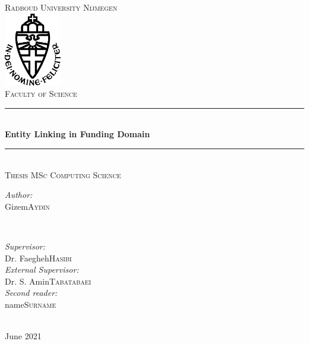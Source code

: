 \documentclass{report}
\title{\thesistitle}
\author{\thesisauthorfirst\space\thesisauthorsecond}
\date{\thesisdate}
\def\thesistitle{Entity Linking in Funding Domain}
\def\thesissubtitle{Thesis Subtitle}
\def\thesisauthorfirst{Gizem}
\def\thesisauthorsecond{Aydin}
\def\thesissupervisorfirst{Dr. Faegheh}
\def\thesissupervisorsecond{Hasibi}
\def\extthesissupervisorfirst{Dr. S. Amin}
\def\extthesissupervisorsecond{Tabatabaei}
\def\thesissecondreaderfirst{name}
\def\thesissecondreadersecond{Surname}
\def\thesisdate{June 2021}
\theoremstyle{definition}
\theoremstyle{remark}
\begin{document}
\begin{titlepage}
	\thispagestyle{empty}
	\newcommand{\HRule}{\rule{\linewidth}{0.5mm}}
	\center
	\textsc{\Large Radboud University Nijmegen}\\[.7cm]
	\includegraphics[width=25mm]{img/in_dei_nomine_feliciter.eps}\\[.5cm]
	\textsc{Faculty of Science}\\[0.5cm]
	
	\HRule \\[0.4cm]
	{ \huge \bfseries \thesistitle}\\[0.1cm]
	\HRule \\[.5cm]
	\textsc{\large Thesis MSc Computing Science}\\[.5cm]
	
	\begin{minipage}{0.4\textwidth}
	\begin{flushleft} \large
	\emph{Author:}\\
	\thesisauthorfirst\space \textsc{\thesisauthorsecond}
	\end{flushleft}
	\end{minipage}
	~
	\begin{minipage}{0.4\textwidth}
	\begin{flushright} \large
	\emph{Supervisor:} \\
	\thesissupervisorfirst\space \textsc{\thesissupervisorsecond} \\[1em]
	\emph{External Supervisor:} \\
	\extthesissupervisorfirst\space \textsc{\extthesissupervisorsecond} \\[1em]
	\emph{Second reader:} \\
	\thesissecondreaderfirst\space \textsc{\thesissecondreadersecond}
	\end{flushright}
	\end{minipage}\\[4cm]
	\vfill
	{\large \thesisdate}\\
	\clearpage
\end{titlepage}
\end{document}
